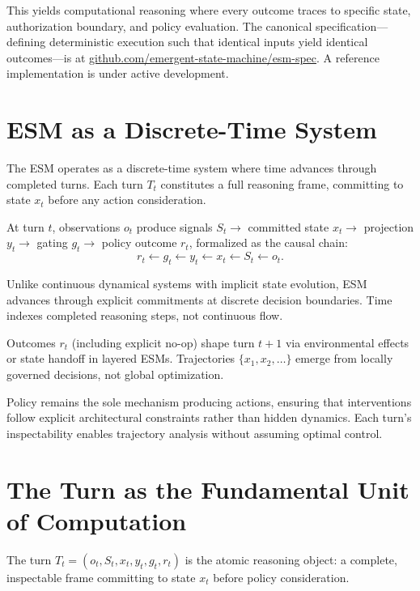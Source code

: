 \documentclass[11pt]{article}
\begin{document}
This yields computational reasoning where every outcome traces to specific state, authorization boundary, and policy evaluation. The canonical specification---defining deterministic execution such that identical inputs yield identical outcomes---is at \href{https://github.com/emergent-state-machine/esm-spec}{github.com/emergent-state-machine/esm-spec}. A reference implementation is under active development.


\section{ESM as a Discrete-Time System}

The ESM operates as a discrete-time system where time advances through completed turns. Each turn $T_t$ constitutes a full reasoning frame, committing to state $x_t$ before any action consideration.

At turn $t$, observations $o_t$ produce signals $S_t \to$ committed state $x_t \to$ projection $y_t \to$ gating $g_t \to$ policy outcome $r_t$, formalized as the causal chain:
\[
r_t \leftarrow g_t \leftarrow y_t \leftarrow x_t \leftarrow S_t \leftarrow o_t.
\]

Unlike continuous dynamical systems with implicit state evolution, ESM advances through explicit commitments at discrete decision boundaries. Time indexes completed reasoning steps, not continuous flow.

Outcomes $r_t$ (including explicit no-op) shape turn $t+1$ via environmental effects or state handoff in layered ESMs. Trajectories $\{x_1, x_2, \dots\}$ emerge from locally governed decisions, not global optimization.

Policy remains the sole mechanism producing actions, ensuring that interventions follow explicit architectural constraints rather than hidden dynamics. Each turn's inspectability enables trajectory analysis without assuming optimal control.



\section{The Turn as the Fundamental Unit of Computation}

The turn $T_t = (o_t, S_t, x_t, y_t, g_t, r_t)$ is the atomic reasoning object: a complete, inspectable frame committing to state $x_t$ before policy consideration.
\end{document}
